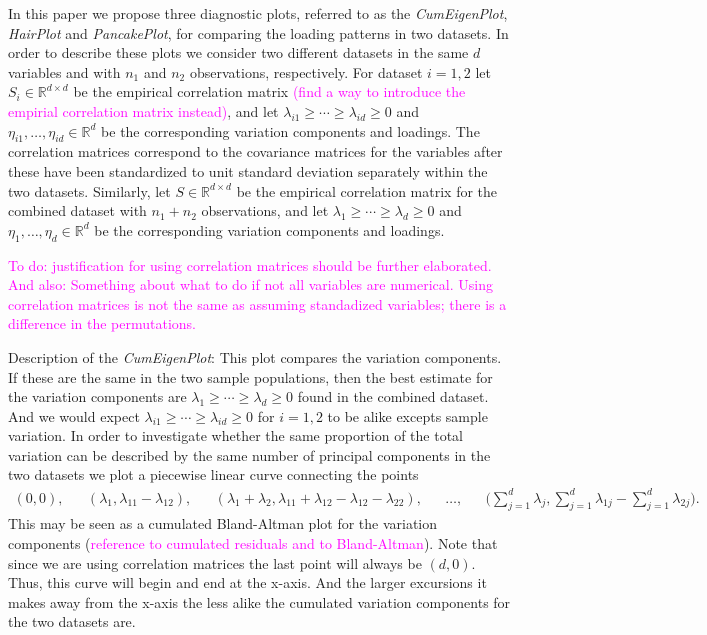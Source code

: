 \documentclass[titlepage,11pt,twoside]{article}
\newcommand{\hl}[1]{\textcolor{magenta}{#1}}
\newcommand{\RR}{\mathbb{R}}
\begin{document}

In this paper we propose three diagnostic plots, referred to as the \emph{CumEigenPlot}, \emph{HairPlot} and \emph{PancakePlot}, for comparing the loading patterns in two datasets. In order to describe these plots we consider two different datasets in the same $d$ variables and with $n_1$ and $n_2$ observations, respectively. For dataset $i=1,2$ let $S_i \in \RR^{d \times d}$ be the empirical correlation matrix \hl{(find a way to introduce the empirial correlation matrix instead)}, and let $\lambda_{i1} \ge \dotsm \ge \lambda_{id} \ge 0 $ and $\eta_{i1},\dotsc,\eta_{id} \in \RR^{d}$ be the corresponding variation components and loadings. The correlation matrices correspond to the covariance matrices for the variables after these have been standardized to unit standard deviation separately within the two datasets. Similarly, let $S \in \RR^{d \times d}$ be the empirical correlation matrix for the combined dataset with $n_1+n_2$ observations, and let $\lambda_1 \ge \dotsm \ge \lambda_d \ge 0$ and $\eta_1,\dotsc,\eta_d \in \RR^d$ be the corresponding variation components and loadings.

\hl{To do: justification for using correlation matrices should be further elaborated. And also: Something about what to do if not all variables are numerical. Using correlation matrices is not the same as assuming standadized variables; there is a difference in the permutations.}

\medskip

Description of the \emph{CumEigenPlot}: This plot compares the variation components. If these are the same in the two sample populations, then the best estimate for the variation components are $\lambda_1 \ge \dotsm \ge \lambda_d \ge 0$ found in the combined dataset. And we would expect $\lambda_{i1} \ge \dotsm \ge \lambda_{id} \ge 0$ for $i=1,2$ to be alike excepts sample variation. In order to investigate whether the same proportion of the total variation can be described by the same number of principal components in the two datasets we plot a piecewise linear curve connecting the points
\begin{align*}
(0,0), &&
(\lambda_1,\lambda_{11}-\lambda_{12}), &&
(\lambda_1 + \lambda_2,\lambda_{11}+\lambda_{12}-\lambda_{12}-\lambda_{22}), &&
\ldots, &&
\bigg( \sum_{j=1}^d \lambda_j, \sum_{j=1}^d \lambda_{1j} - \sum_{j=1}^d \lambda_{2j} \bigg).
\end{align*}
This may be seen as a cumulated Bland-Altman plot for the variation components (\hl{reference to cumulated residuals and to Bland-Altman}). Note that since we are using correlation matrices the last point will always be $(d,0)$. Thus, this curve will begin and end at the x-axis. And the larger excursions it makes away from the x-axis the less alike the cumulated variation components for the two datasets are.
\end{document}
